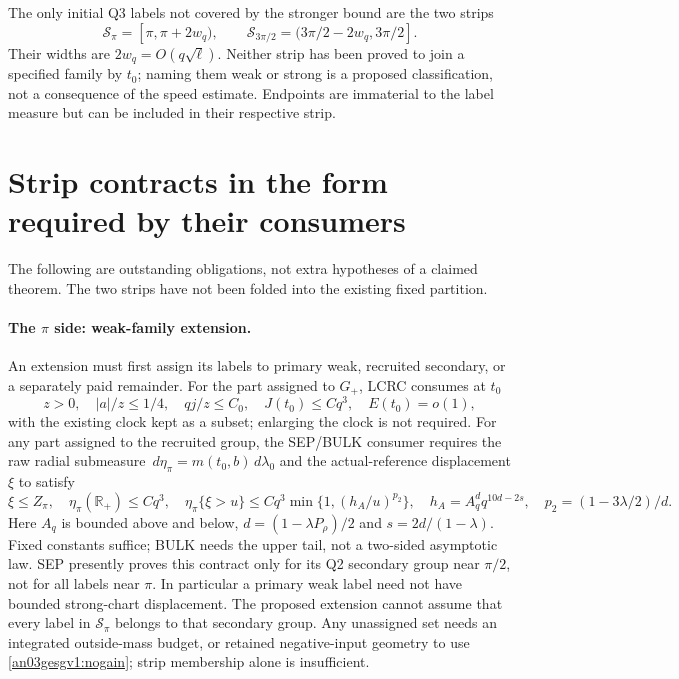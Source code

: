 \documentclass[11pt]{article}
\theoremstyle{remark}\newtheorem{remark}[proposition]{Remark}
\newcommand{\dd}{\,d}
\newcommand{\Gp}{G_+}
\begin{document}
The only initial Q3 labels not covered by the stronger bound
are the two strips
\begin{equation}
 \mathcal S_\pi=[\pi,\pi+2w_q),\qquad
 \mathcal S_{3\pi/2}=(3\pi/2-2w_q,3\pi/2].
 \label{an03gesgv1:strips}
\end{equation}
Their widths are $2w_q=O(q\sqrt\ell)$. Neither strip has been
proved to join a specified family by $t_0$; naming them weak
or strong is a proposed classification, not a consequence of
the speed estimate. Endpoints are immaterial to the label
measure but can be included in their respective strip.

\section{Strip contracts in the form required by their consumers}
\label{an03gesgv1:stripcontracts}
The following are outstanding obligations, not extra hypotheses
of a claimed theorem. The two strips have not been folded into
the existing fixed partition.

\paragraph{The $\pi$ side: weak-family extension.}
An extension must first assign its labels to primary weak,
recruited secondary, or a separately paid remainder. For the
part assigned to $\Gp$, LCRC consumes at $t_0$
\[
 z>0,\quad |a|/z\le1/4,\quad qj/z\le C_0,\quad
 J(t_0)\le Cq^3,\quad E(t_0)=o(1),
\]
with the existing clock kept as a subset; enlarging the
clock is not required. For any part assigned to the recruited
group, the SEP/BULK consumer requires the raw radial submeasure
$\dd\eta_\pi=m(t_0,b)\dd\lambda_0$ and the actual-reference
displacement $\xi$ to satisfy
\begin{equation}
 \xi\le Z_\pi,\quad \eta_\pi(\mathbb R_+)\le Cq^3,\quad
 \eta_\pi\{\xi>u\}\le Cq^3\min\{1,(h_A/u)^{p_2}\},
 \quad h_A=A_q^dq^{10d-2s},\quad p_2=(1-3\lambda/2)/d.
 \label{an03gesgv1:pistripcontract}
\end{equation}
Here $A_q$ is bounded above and below, $d=(1-\lambda P_\rho)/2$
and $s=2d/(1-\lambda)$. Fixed constants suffice; BULK needs
the upper tail, not a two-sided asymptotic law. SEP presently
proves this contract only for its Q2 secondary group near
$\pi/2$, not for all labels near $\pi$. In particular a
primary weak label need not have bounded strong-chart
displacement. The proposed extension cannot assume that
every label in $\mathcal S_\pi$ belongs to that secondary group.
Any unassigned set needs an integrated outside-mass budget,
or retained negative-input geometry to use
\eqref{an03gesgv1:nogain}; strip membership alone is insufficient.
\end{document}
